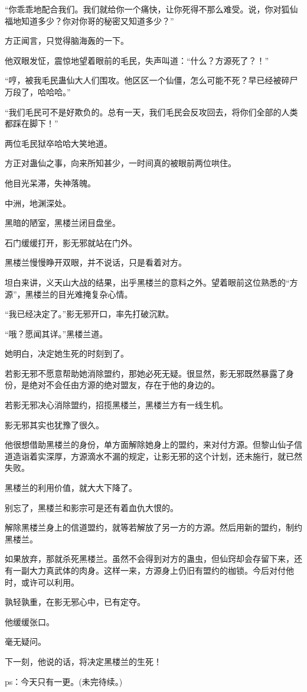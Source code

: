 \begin{this_body}
“你乖乖地配合我们。我们就给你一个痛快，让你死得不那么难受。说，你对狐仙福地知道多少？你对你哥的秘密又知道多少？”

方正闻言，只觉得脑海轰的一下。

他双眼发怔，震惊地望着眼前的毛民，失声叫道：“什么？方源死了？！”

“哼，被我毛民蛊仙大人们围攻。他区区一个仙僵，怎么可能不死？早已经被碎尸万段了，哈哈哈。”

“我们毛民可不是好欺负的。总有一天，我们毛民会反攻回去，将你们全部的人类都踩在脚下！”

两位毛民狱卒哈哈大笑地道。

方正对蛊仙之事，向来所知甚少，一时间真的被眼前两位哄住。

他目光呆滞，失神落魄。

中洲，地渊深处。

黑暗的陋室，黑楼兰闭目盘坐。

石门缓缓打开，影无邪就站在门外。

黑楼兰慢慢睁开双眼，并不说话，只是看着对方。

坦白来讲，义天山大战的结果，出乎黑楼兰的意料之外。望着眼前这位熟悉的“方源”，黑楼兰的目光难掩复杂心情。

“我已经决定了。”影无邪开口，率先打破沉默。

“哦？愿闻其详。”黑楼兰道。

她明白，决定她生死的时刻到了。

若影无邪不愿意帮助她消除盟约，那她必死无疑。很显然，影无邪既然暴露了身份，是绝对不会任由方源的绝对盟友，存在于他的身边的。

若影无邪决心消除盟约，招揽黑楼兰，黑楼兰方有一线生机。

影无邪其实也犹豫了很久。

他很想借助黑楼兰的身份，单方面解除她身上的盟约，来对付方源。但黎山仙子信道造诣着实深厚，方源滴水不漏的规定，让影无邪的这个计划，还未施行，就已然失败。

黑楼兰的利用价值，就大大下降了。

别忘了，黑楼兰和影宗可是还有着血仇大恨的。

解除黑楼兰身上的信道盟约，就等若解放了另一方的方源。然后用新的盟约，制约黑楼兰。

如果放弃，那就杀死黑楼兰。虽然不会得到对方的蛊虫，但仙窍却会存留下来，还有一副大力真武体的肉身。这样一来，方源身上仍旧有盟约的枷锁。今后对付他时，或许可以利用。

孰轻孰重，在影无邪心中，已有定夺。

他缓缓张口。

毫无疑问。

下一刻，他说的话，将决定黑楼兰的生死！

ps：今天只有一更。(未完待续。)

\end{this_body}

